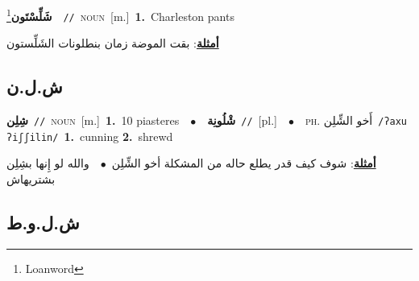 \documentclass[10pt,a4paper,twoside]{article} %
\begin{document}
\begin{multicols}{2}
{\setlength\topsep{0pt}\textbf{\foreignlanguage{arabic}{شَلِّسْتَون}}\footnote{Loanword}\ \ {\color{gray}\texttt{//}\color{black}}\ \textsc{noun}\ [m.]\ \textbf{1.}~Charleston pants\  \begin{flushright}\color{gray}\foreignlanguage{arabic}{\textbf{\underline{\foreignlanguage{arabic}{أمثلة}}}: بقت الموضة زمان بنطلونات الشَلِّستون}\end{flushright}\color{black}} \vspace{2mm}

\vspace{-3mm}
\subsection*{\color{blue}\foreignlanguage{arabic}{ش.ل.ن}\color{blue}{}} 

{\setlength\topsep{0pt}\textbf{\foreignlanguage{arabic}{شِلِن}}\ {\color{gray}\texttt{//}\color{black}}\ \textsc{noun}\ [m.]\ \textbf{1.}~10 piasteres\ \ $\bullet$\ \ \setlength\topsep{0pt}\textbf{\foreignlanguage{arabic}{شْلُونِة}}\ {\color{gray}\texttt{//}\color{black}}\ [pl.]\ \ $\bullet$\ \ \textsc{ph.} \color{gray} \foreignlanguage{arabic}{أَخو الشِّلِن}\color{black}\ {\color{gray}\texttt{/{\sffamily ʔaxu ʔiʃʃilin}/}\color{black}}\ \textbf{1.}~cunning  \textbf{2.}~shrewd\  \begin{flushright}\color{gray}\foreignlanguage{arabic}{\textbf{\underline{\foreignlanguage{arabic}{أمثلة}}}: شوف كيف قدر يطلع حاله من المشكلة أخو الشِّلِن\ $\bullet$\ \  والله لو إِنها بشِلِن بشتريهاش}\end{flushright}\color{black}} \vspace{2mm}

\vspace{-3mm}
\subsection*{\color{blue}\foreignlanguage{arabic}{ش.ل.و.ط}\color{blue}{}} 


\end{multicols}
\end{document}

